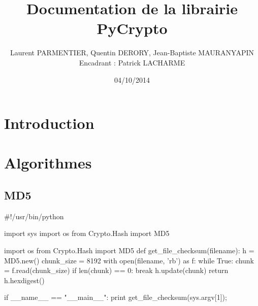 \documentclass[a4paper, 12pt]{report}
\author{Laurent PARMENTIER, Quentin DERORY, Jean-Baptiste MAURANYAPIN \\ Encadrant : Patrick LACHARME}
\title{\bf{Documentation de la librairie PyCrypto}}
\date{04/10/2014}
\begin{document}
\maketitle

\tableofcontents

\chapter*{Introduction}

\chapter{Algorithmes}

\section{MD5}

    #!/usr/bin/python 
     
    import sys
    import os
    from Crypto.Hash import MD5
     
    import os
    from Crypto.Hash import MD5
    def get_file_checksum(filename):
        h = MD5.new()
        chunk_size = 8192 
        with open(filename, 'rb') as f:
            while True:
                chunk = f.read(chunk_size)
                if len(chunk) == 0:
                    break
                h.update(chunk)
        return h.hexdigest()
     
    if __name__ == "__main__":
        print get_file_checksum(sys.argv[1]);
\end{document}
